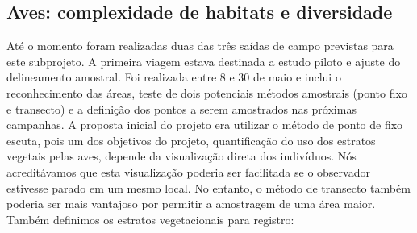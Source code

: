 \subsection{Aves: complexidade de habitats e diversidade} %
\label{sec:compl-de-habit} 

Até o momento foram realizadas duas das três saídas de campo previstas
para este subprojeto. A primeira viagem estava destinada a estudo piloto
e ajuste do delineamento amostral. Foi realizada entre 8 e 30 de
maio e inclui o reconhecimento das áreas, teste de dois
potenciais métodos amostrais (ponto fixo e transecto) e a definição dos pontos a serem
amostrados nas próximas campanhas. 
A proposta inicial do projeto era utilizar o método de ponto de
fixo escuta, pois um dos objetivos do projeto, quantificação do uso dos
estratos vegetais pelas aves, depende da visualização direta dos
indivíduos. Nós acreditávamos que esta visualização poderia ser
facilitada se o observador estivesse parado em um mesmo local. No
entanto, o método de transecto também poderia ser mais vantajoso por
permitir a amostragem de uma área maior. 
Também definimos os estratos vegetacionais para registro: 
